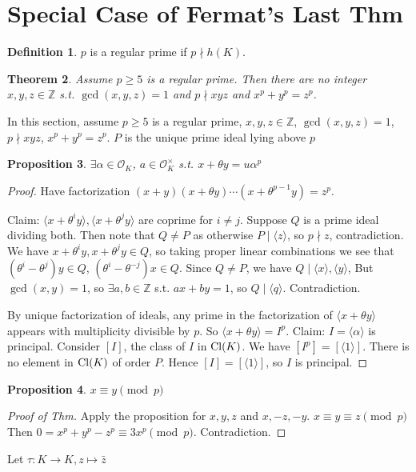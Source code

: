 \documentclass{article}
\theoremstyle{definition}
\newtheorem{defn}{Definition}[section]
\theoremstyle{remark}
\theoremstyle{plain}
\newtheorem{thm}[defn]{Theorem}
\newtheorem{prop}[defn]{Proposition}
\newcommand{\ZZ}{\mathbb{Z}}
\begin{document}
\section{Special Case of Fermat's Last Thm}

\begin{defn}
    $p$ is a regular prime if $p\nmid h(K)$.
\end{defn}
\begin{thm}
    Assume $p\ge 5$ is a regular prime. Then there are no integer $x,y,z\in\ZZ$ s.t. $\gcd(x,y,z)=1$ and $p\nmid xyz$ and $x^p+y^p=z^p$.
\end{thm}
In this section, assume $p\ge 5$ is a regular prime, $x,y,z\in\ZZ$, $\gcd(x,y,z)=1$, $p\nmid xyz$, $x^p+y^p=z^p$. $P$ is the unique prime ideal lying above $p$
\begin{prop}
    $\exists\alpha\in\mathcal O_K$, $a\in\mathcal O_K^\times$ s.t. $x+\theta y=u\alpha^p$
\end{prop}
\begin{proof}
    Have factorization $(x+y)(x+\theta y)\cdots(x+\theta^{p-1}y)=z^p$. 
    
    Claim: $\langle x+\theta^iy\rangle,\langle x+\theta^jy\rangle$ are coprime for $i\neq j$. Suppose $Q$ is a prime ideal dividing both. Then note that $Q\neq P$ as otherwise $P\mid \langle z\rangle$, so $p\nmid z$, contradiction. We have $x+\theta^iy,x+\theta^jy\in Q$, so taking proper linear combinations we see that $(\theta^i-\theta^j)y\in Q$, $(\theta^i-\theta^{-j})x\in Q$. Since $Q\neq P$, we have $Q\mid \langle x\rangle,\langle y\rangle$, But $\gcd(x,y)=1$, so $\exists a,b\in\ZZ$ s.t. $ax+by=1$, so $Q\mid \langle q\rangle$. Contradiction.

    By unique factorization of ideals, any prime in the factorization of $\langle x+\theta y\rangle$ appears with multiplicity divisible by $p$. So $\langle x+\theta y\rangle= I^p$. Claim: $I=\langle\alpha\rangle$ is principal. Consider $[I]$, the class of $I$ in $\operatorname{Cl}(K)$. We have $[I^p]=[\langle 1\rangle]$. There is no element in $\operatorname{Cl}(K)$ of order $P$. Hence $[I]=[\langle 1\rangle]$, so $I$ is principal.
\end{proof}
\begin{prop}
    $x\equiv y\pmod p$
\end{prop}
\begin{proof}[Proof of Thm]
    Apply the proposition for $x,y,z$ and $x,-z,-y$. $x\equiv y\equiv z\pmod p$ Then $0=x^p+y^p-z^p\equiv 3x^p\pmod p$. Contradiction.
\end{proof}
Let $\tau:K\to K, z\mapsto\bar z$
\end{document}
